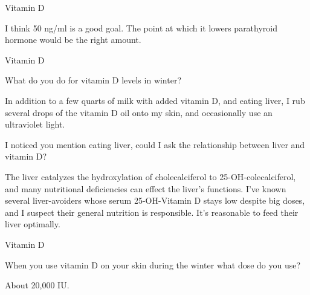 \documentclass[11pt,oneside,openany,extrafontsizes]{memoir}
\begin{document}
\begin{standalonequote}{Vitamin D}

    \begin{answer}
        I think 50 ng/ml is a good goal. The point at which it lowers parathyroid hormone would be the right amount.
    \end{answer}
\end{standalonequote}

\begin{emailexchange}{Vitamin D}

    \begin{question}
        What do you do for vitamin D levels in winter?
    \end{question}

    \begin{answer}
       In addition to a few quarts of milk with added vitamin D, and eating liver, I rub several drops of the vitamin D oil onto my skin, and occasionally use an ultraviolet light. 
    \end{answer}

    \begin{question}
        I noticed you mention eating liver, could I ask the relationship between liver and vitamin D?
    \end{question}

    \begin{answer}
       The liver catalyzes the hydroxylation of cholecalciferol to 25-OH-colecalciferol, and many nutritional deficiencies can effect the liver's functions. I've known several liver-avoiders whose serum 25-OH-Vitamin D stays low despite big doses, and I suspect their general nutrition is responsible. It's reasonable to feed their liver optimally. 
    \end{answer}
\end{emailexchange}

\begin{qaexchange}{Vitamin D}

    \begin{question}
        When you use vitamin D on your skin during the winter what dose do you use?
    \end{question}

    \begin{answer}
       About 20,000 IU. 
    \end{answer}
\end{qaexchange}
\end{document}
